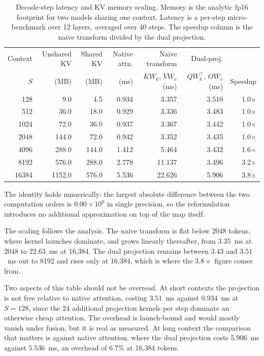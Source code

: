\documentclass[11pt]{article}
\begin{document}
\begin{table}[ht]
\centering
\footnotesize
\setlength{\tabcolsep}{5pt}
\caption{Decode-step latency and KV memory scaling. Memory is the analytic fp16 footprint
for two models sharing one context. Latency is a per-step micro-benchmark over 12 layers,
averaged over 40 steps. The speedup column is the naive transform divided by the dual
projection.}
\label{tab:latency}
\begin{tabular}{rrrrrrr}
\toprule
Context & Unshared KV & Shared KV & Native attn. & Naive transform & Dual-proj. & \\
$S$ & (MB) & (MB) & (ms) & $K W_k,\, V W_v$ (ms) & $QW_k^{\!\top},\, OW_v$ (ms) & Speedup \\
\midrule
128    & 9.0    & 4.5   & 0.934 & 3.357  & 3.510 & 1.0$\times$ \\
512    & 36.0   & 18.0  & 0.929 & 3.336  & 3.483 & 1.0$\times$ \\
1024   & 72.0   & 36.0  & 0.937 & 3.367  & 3.442 & 1.0$\times$ \\
2048   & 144.0  & 72.0  & 0.942 & 3.352  & 3.435 & 1.0$\times$ \\
4096   & 288.0  & 144.0 & 1.412 & 5.464  & 3.432 & 1.6$\times$ \\
8192   & 576.0  & 288.0 & 2.778 & 11.137 & 3.496 & 3.2$\times$ \\
16384  & 1152.0 & 576.0 & 5.536 & 22.626 & 5.906 & 3.8$\times$ \\
\bottomrule
\end{tabular}
\end{table}

The identity holds numerically: the largest absolute difference between the two computation
orders is $0.00 \times 10^{0}$ in single precision, so the reformulation introduces no
additional approximation on top of the map itself.

The scaling follows the analysis. The naive transform is flat below 2048 tokens, where
kernel launches dominate, and grows linearly thereafter, from $3.35$~ms at 2048 to
$22.63$~ms at 16{,}384. The dual projection remains between $3.43$ and $3.51$~ms out to 8192
and rises only at 16{,}384, which is where the $3.8\times$ figure comes from.

Two aspects of this table should not be overread. At short contexts the projection is not
free relative to native attention, costing $3.51$~ms against $0.934$~ms at $S = 128$, since
the 24 additional projection kernels per step dominate an otherwise cheap attention. The
overhead is launch-bound and would mostly vanish under fusion, but it is real as measured.
At long context the comparison that matters is against native attention, where the dual
projection costs $5.906$~ms against $5.536$~ms, an overhead of $6.7\%$ at 16{,}384 tokens.
\end{document}

